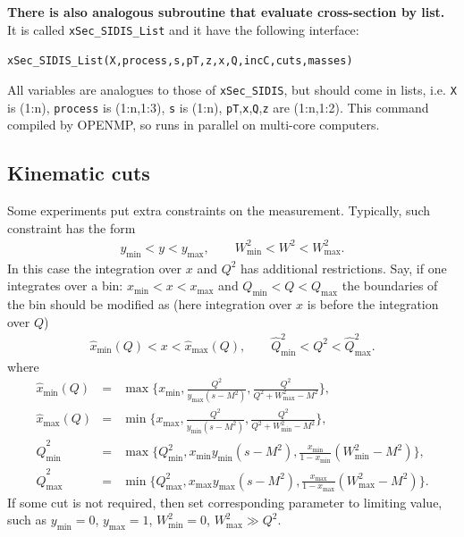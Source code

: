 \documentclass[prd,nofootinbib,eqsecnum,final]{revtex4}
\renewcommand{\(}{\left(}
\renewcommand{\)}{\right)}
\renewcommand{\[}{\left[}
\renewcommand{\]}{\right]}
\newcommand{\blue}[1]{{\color{blue} #1}}
\begin{document}
\begin{tcolorbox}
\textbf{\blue{There is also analogous subroutine that evaluate cross-section by list.}} It is called \texttt{xSec\_SIDIS\_List} and it have the following interface:

\begin{center}
\texttt{xSec\_SIDIS\_List(X,process,s,pT,z,x,Q,incC,cuts,masses)}
\end{center}
All variables are analogues to those of \texttt{xSec\_SIDIS}, but should come in lists, i.e. \texttt{X} is (1:n), \texttt{process} is (1:n,1:3), \texttt{s} is (1:n), \texttt{pT},\texttt{x},\texttt{Q},\texttt{z} are (1:n,1:2). This command compiled by OPENMP, so runs in parallel on multi-core computers.
\end{tcolorbox}

\subsection{Kinematic cuts}
\label{TMDXs:cuts}

Some experiments put extra constraints on the measurement. Typically, such constraint has the form
\begin{eqnarray}
y_{\min}<y<y_{\max},\qquad W^2_{\min}<W^2<W_{\max}^2.
\end{eqnarray}
In this case the integration over $x$ and $Q^2$ has additional restrictions. Say, if one integrates over a bin: $x_{\min}<x<x_{\max}$ and $Q_{\min}<Q<Q_{\max}$ the boundaries of the bin should be modified as (here integration over $x$ is before the integration over $Q$)
\begin{eqnarray}
\hat x_{\text{min}}(Q)<x<\hat x_{\text{max}}(Q),
\qquad
\hat Q^2_{\text{min}}<Q^2<\hat Q^2_{\text{max}}.
\end{eqnarray}
where
\begin{eqnarray*}
\hat x_{\text{min}}(Q)&=&\max\{x_{\text{min}},\frac{Q^2}{y_{\text{max}}(s-M^2)},\frac{Q^2}{Q^2+W^2_{\text{max}}-M^2}\},
\\
\hat x_{\text{max}}(Q)&=&\min\{x_{\text{max}},\frac{Q^2}{y_{\text{min}}(s-M^2)},\frac{Q^2}{Q^2+W^2_{\text{min}}-M^2}\},
\\
\hat Q^2_{\text{min}}&=&\max\{Q^2_{\text{min}},x_{\text{min}}y_{\text{min}}(s-M^2),\frac{x_{\text{min}}}{1-x_{\text{min}}}(W^2_{\text{min}}-M^2)\},
\\
\hat Q^2_{\text{max}}&=&\min\{Q^2_{\text{max}},x_{\text{max}}y_{\text{max}}(s-M^2),\frac{x_{\text{max}}}{1-x_{\text{max}}}(W^2_{\text{max}}-M^2)\}.
\end{eqnarray*}
If some cut is not required, then set corresponding parameter to limiting value, such as $y_{\min}=0$, $y_{\max}=1$, $W^2_{\min}=0$, $W^2_{\max}\gg Q^2$.
\end{document}
